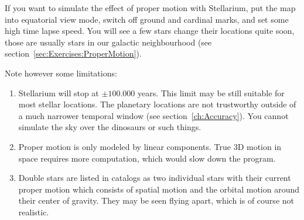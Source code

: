 If you want to simulate the effect of proper motion with Stellarium,
put the map into equatorial view mode, switch off ground and cardinal
marks, and set some high time lapse speed. You will see a few stars
change their locations quite soon, those are usually stars in our
galactic neighbourhood (see section~\ref{sec:Exercises:ProperMotion}).

Note however some limitations:
\begin{enumerate}
\item Stellarium will stop at $\pm 100.000$ years. This limit may be
  still suitable for most stellar locations. The planetary locations
  are not trustworthy outside of a much narrower temporal window (see
  section~\ref{ch:Accuracy}). You cannot simulate the sky over the
  dinosaurs or such things.
\item Proper motion is only modeled by linear components. True 3D
  motion in space requires more computation, which would slow down the
  program.
\item Double stars are listed in catalogs as two individual stars with
  their current proper motion which consists of spatial motion and the 
  orbital motion around their center of gravity. They may be seen flying 
  apart, which is of course not realistic.
\end{enumerate}

